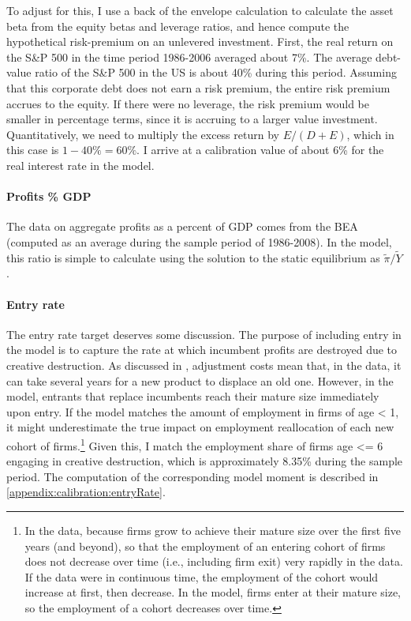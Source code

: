 \documentclass[11pt,english]{article}
\begin{document}
To adjust for this, I use a back of the envelope calculation to calculate the asset beta from the equity betas and leverage ratios, and hence compute the hypothetical risk-premium on an unlevered investment. First, the real return on the S\&P 500 in the time period 1986-2006 averaged about 7\%. The average debt-value ratio of the S\&P 500 in the US is about 40\% during this period. Assuming that this corporate debt does not earn a risk premium, the entire risk premium accrues to the equity. If there were no leverage, the risk premium would be smaller in percentage terms, since it is accruing to a larger value investment. Quantitatively, we need to multiply the excess return by $E / (D + E)$, which in this case is $1 - 40\% = 60\%$. I arrive at a calibration value of about 6\% for the real interest rate in the model.

\paragraph{Profits \% GDP} 

The data on aggregate profits as a percent of GDP comes from the BEA (computed as an average during the sample period of 1986-2008). In the model, this ratio is simple to calculate using the solution to the static equilibrium as $\tilde{\pi} / \tilde{Y}$.



\paragraph{Entry rate}

The entry rate target deserves some discussion. The purpose of including entry in the model is to capture the rate at which incumbent profits are destroyed due to creative destruction. As discussed in \cite{klenow_innovative_2020}, adjustment costs mean that, in the data, it can take several years for a new product to displace an old one. However, in the model, entrants that replace incumbents reach their mature size immediately upon entry. If the model matches the amount of employment in firms of age < 1, it might underestimate the true impact on employment reallocation of each new cohort of firms.\footnote{In the data, because firms grow to achieve their mature size over the first five years (and beyond), so that the employment of an entering cohort of firms does not decrease over time (i.e., including firm exit) very rapidly in the data. If the data were in continuous time, the employment of the cohort would increase at first, then decrease. In the model, firms enter at their mature size, so the employment of a cohort decreases over time.} Given this, I match the employment share of firms age <= 6 engaging in creative destruction, which is approximately 8.35\% during the sample period. The computation of the corresponding model moment is described in \ref{appendix:calibration:entryRate}.
\end{document}
